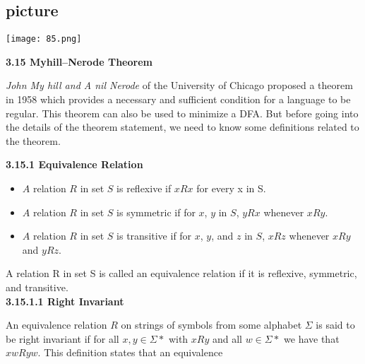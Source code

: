 \documentclass[8pt]{beamer}
\begin{document}
\begin{frame}
\begin{center}
\section{picture}
\texttt{[image: 85.png]}
\end{center}

\pause
\large{
\textbf{3.15 Myhill–Nerode Theorem}
}

\vspace*{0.2cm}
\emph{John My hill and A nil Nerode} of the University of Chicago proposed a theorem in 1958 which provides
a necessary and sufficient condition for a language to be regular. This theorem can also be used to
minimize a DFA. But before going into the details of the theorem statement, we need to know some
definitions related to the theorem.

\vspace*{0.4cm}
\end{frame}


\begin{frame}
\large{
\textbf{3.15.1 Equivalence Relation}
}

\vspace*{0.2cm}
\begin{itemize}
  \item $A$ relation $R$ in set $S$ is reflexive if $xRx$ for every x in S.\\
  \item $A$ relation $R$ in set $S$ is symmetric if for $x$, $y$ in $S$, $yRx$ whenever $xRy$.\\
  \item $A$ relation $R$ in set $S$ is transitive if for $x$, $y$, and $z$ in $S$, $xRz$ whenever $xRy$ and $yRz$.\\
\end{itemize}

\vspace*{0.2cm}
A relation R in set S is called an equivalence relation if it is reflexive, symmetric, and transitive.\\

\vspace*{0.4cm}
\large{
\textbf{3.15.1.1 Right Invariant}\\
}

\vspace*{0.2cm}
An equivalence relation $R$ on strings of symbols from some alphabet $\Sigma$ is said to be right invariant if for
all $x, y \in \Sigma*$ with $xRy$ and all $w \in \Sigma*$ we have that $xw R yw$. This definition states that an equivalence\\
\end{frame}
\end{document}
